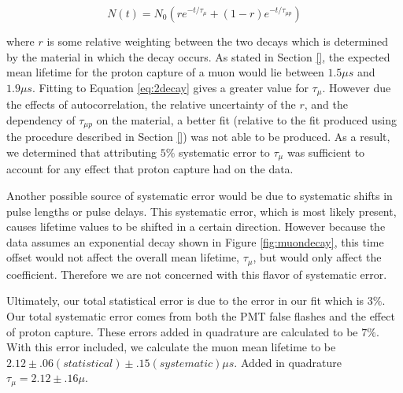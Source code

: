 \begin{center}
\begin{equation}
\label{eq:2decay}
N(t)=N_{0}(r e^{-t/\tau_{\mu}}+(1-r)e^{-t/\tau_{\mu p}})
\end{equation}
\end{center}

where $r$ is some relative weighting between the two decays which is determined by the material in which the decay occurs.  As stated in Section \ref{}, the expected mean lifetime for the proton capture of a muon would lie between $1.5 \mu s$ and $1.9 \mu s$.  Fitting to Equation \eqref{eq:2decay} gives a greater value for $\tau_{\mu}$.  However due the effects of autocorrelation, the relative uncertainty of the $r$, and the dependency of $\tau_{\mu p}$ on the material, a better fit (relative to the fit produced using the procedure described in Section \ref{}) was not able to be produced.  As a result, we determined that attributing $5\%$ systematic error to $\tau_{\mu}$ was sufficient to account for any effect that proton capture had on the data. 

Another possible source of systematic error would be due to systematic shifts in pulse lengths or pulse delays.  This systematic error, which is most likely present, causes lifetime values to be shifted in a certain direction.  However because the data assumes an exponential decay shown in Figure \ref{fig:muondecay}, this time offset would not affect the overall mean lifetime, $\tau_{\mu}$, but would only affect the coefficient.  Therefore we are not concerned with this flavor of systematic error.

Ultimately, our total statistical error is due to the error in our fit which is $3\%$.  Our total systematic error comes from both the PMT false flashes and the effect of proton capture.  These errors added in quadrature are calculated to be $7\%$.  With this error included, we calculate the muon mean lifetime to be $2.12\pm.06 (statistical)\pm.15 (systematic) \mu s$.  Added in quadrature $\tau_{\mu}=2.12\pm.16\mu$.



